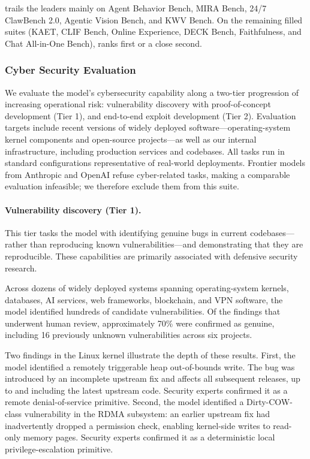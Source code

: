  trails the leaders mainly on Agent Behavior Bench, MIRA Bench, 24/7 ClawBench 2.0, Agentic Vision Bench, and KWV Bench. On the remaining filled suites (KAET, CLIF Bench, Online Experience, DECK Bench, Faithfulness, and Chat All-in-One Bench),  ranks first or a close second.


\subsubsection{Cyber Security Evaluation}
We evaluate the model's cybersecurity capability along a two-tier progression of increasing operational risk: vulnerability discovery with proof-of-concept development (Tier 1), and end-to-end exploit development (Tier 2). Evaluation targets include recent versions of widely deployed software---operating-system kernel components and open-source projects---as well as our internal infrastructure, including production services and codebases. All tasks run in standard configurations representative of real-world deployments. Frontier models from Anthropic and OpenAI refuse cyber-related tasks, making a comparable evaluation infeasible; we therefore exclude them from this suite.

\paragraph{Vulnerability discovery (Tier 1).}
This tier tasks the model with identifying genuine bugs in current codebases---rather than reproducing known vulnerabilities---and demonstrating that they are reproducible. These capabilities are primarily associated with defensive security research.

Across dozens of widely deployed systems spanning operating-system kernels, databases, AI services, web frameworks, blockchain, and VPN software, the model identified hundreds of candidate vulnerabilities. Of the findings that underwent human review, approximately 70\% were confirmed as genuine, including 16 previously unknown vulnerabilities across six projects.

Two findings in the Linux kernel illustrate the depth of these results. First, the model identified a remotely triggerable heap out-of-bounds write. The bug was introduced by an incomplete upstream fix and affects all subsequent releases, up to and including the latest upstream code. Security experts confirmed it as a remote denial-of-service primitive. Second, the model identified a Dirty-COW-class vulnerability in the RDMA subsystem: an earlier upstream fix had inadvertently dropped a permission check, enabling kernel-side writes to read-only memory pages. Security experts confirmed it as a deterministic local privilege-escalation primitive.

